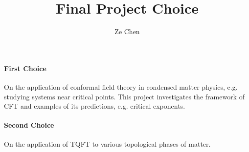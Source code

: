 \documentclass{article}
\title{Final Project Choice}
\author{Ze Chen}
\begin{document}
\maketitle

\paragraph*{First Choice}%
On the application of conformal field theory in condensed matter physics, e.g. studying systems near critical points.
This project investigates the framework of CFT and examples of its predictions, e.g. critical exponents.

\paragraph*{Second Choice}%
On the application of TQFT to various topological phases of matter.
\end{document}
